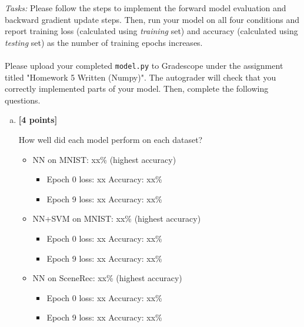 \begin{tcolorbox}[colback=orange!5!white,colframe=orange!75!black]
\emph{Tasks:} Please follow the steps to implement the forward model evaluation and backward gradient update steps. Then, run your model on all four conditions and report training loss (calculated using \emph{training} set) and accuracy (calculated using \emph{testing} set) as the number of training epochs increases.
\\
\\
Please upload your completed \texttt{model.py} to Gradescope under the assignment titled "Homework 5 Written (Numpy)". The autograder will check that you correctly implemented parts of your model. Then, complete the following questions.
\end{tcolorbox}
\pagebreak
\begin{enumerate} [(a)]
    \item \textbf{[4 points]}
    \begin{tcolorbox}[colback=orange!5!white,colframe=orange!75!black]
    How well did each model perform on each dataset?
    \end{tcolorbox}
    \begin{tcolorbox}[colback=white!5!white,colframe=green!75!black]
        \begin{itemize}
            \item NN on MNIST: xx\% (highest accuracy)
            	\begin{itemize}
            	\item Epoch 0 loss: xx     Accuracy: xx\%
            	\item Epoch 9 loss: xx     Accuracy: xx\%
            	\end{itemize}
            \item NN+SVM on MNIST: xx\% (highest accuracy)
            	\begin{itemize}
            	\item Epoch 0 loss: xx     Accuracy: xx\%
            	\item Epoch 9 loss: xx     Accuracy: xx\%
            	\end{itemize}
            \item NN on SceneRec: xx\% (highest accuracy)
            	\begin{itemize}
            	\item Epoch 0 loss: xx     Accuracy: xx\%
            	\item Epoch 9 loss: xx     Accuracy: xx\%

\end{itemize}
\end{itemize}
\end{tcolorbox}
\end{enumerate}
